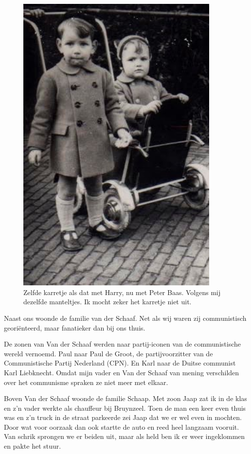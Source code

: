 \documentclass[12pt,twoside, openright]{memoir}
\begin{document}
\begin{figure}
\centering
\includegraphics[width=0.9\textwidth]{img/ch5/peterme}
\caption*{\footnotesize Zelfde karretje als dat met Harry, nu met Peter Baas. Volgens mij dezelfde manteltjes. Ik mocht zeker het karretje niet uit.}
\end{figure}

Naast ons woonde de familie van der Schaaf. Net als wij waren zij communistisch georiënteerd, maar fanatieker dan bij ons thuis. 

De zonen van Van der Schaaf werden naar partij-iconen van de communistische wereld vernoemd. Paul naar Paul de Groot, de partijvoorzitter van de Communistische Partij Nederland (CPN). En Karl naar de Duitse communist Karl Liebknecht. Omdat mijn vader en Van der Schaaf van mening verschilden over het communisme spraken ze niet meer met elkaar.  

Boven Van der Schaaf woonde de familie Schaap. Met zoon Jaap zat ik in de klas en z’n vader werkte als chauffeur bij Bruynzeel. Toen de man een keer even thuis was en z'n truck in de straat parkeerde zei Jaap dat we er wel even in mochten. Door wat voor oorzaak dan ook startte de auto en reed heel langzaam vooruit. Van schrik sprongen we er beiden uit, maar als held ben ik er weer ingeklommen en pakte het stuur. 
\end{document}
